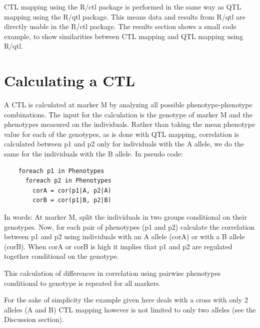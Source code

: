 
  CTL mapping using the R/ctl package is performed in the same way as QTL mapping using the R/qtl \cite{Broman:2003, Arends:2010} 
  package. This means data and results from R/qtl are directly usable in the R/ctl package. The results section shows a small code 
  example, to show similarities between CTL mapping and QTL mapping using R/qtl.

\section{Calculating a CTL}
  A CTL is calculated at marker M by analyzing all possible phenotype-phenotype combinations. The input for the calculation is 
  the genotype of marker M and the phenotypes measured on the individuals. Rather than taking the mean phenotype value for each 
  of the genotypes, as is done with QTL mapping, correlation is calculated between p1 and p2 only for individuals with the 
  A allele, we do the same for the individuals with the B allele. In pseudo code:
\begin{verbatim}
    foreach p1 in Phenotypes
      foreach p2 in Phenotypes
        corA = cor(p1|A, p2|A)
        corB = cor(p1|B, p2|B)
\end{verbatim}
  In words: At marker M, split the individuals in two groups conditional on their genotypes. Now, for each pair of phenotypes 
  (p1 and p2) calculate the correlation between p1 and p2 using individuals with an A allele (corA) or with a B allele (corB). 
  When corA or corB is high it implies that p1 and p2 are regulated together conditional on the genotype.

  This calculation of differences in correlation using pairwise phenotypes conditional to genotype is repeated for all markers.

  For the sake of simplicity the example given here deals with a cross with only 2 alleles (A and B) CTL mapping however is not 
  limited to only two alleles (see the Discussion section).

